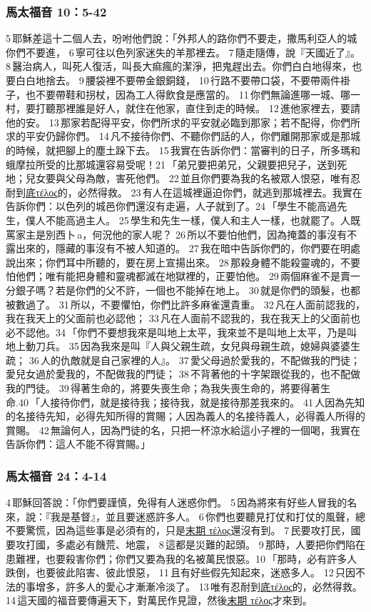 \subsubsection{馬太福音 10：5-42}
5 耶穌差這十二個人去，吩咐他們說：「外邦人的路你們不要走，撒馬利亞人的城你們不要進， 6 寧可往以色列家迷失的羊那裡去。 7 隨走隨傳，說『天國近了』。 8 醫治病人，叫死人復活，叫長大痲瘋的潔淨，把鬼趕出去。你們白白地得來，也要白白地捨去。 9 腰袋裡不要帶金銀銅錢， 10 行路不要帶口袋，不要帶兩件褂子，也不要帶鞋和拐杖，因為工人得飲食是應當的。 11 你們無論進哪一城、哪一村，要打聽那裡誰是好人，就住在他家，直住到走的時候。 12 進他家裡去，要請他的安。 13 那家若配得平安，你們所求的平安就必臨到那家；若不配得，你們所求的平安仍歸你們。 14 凡不接待你們、不聽你們話的人，你們離開那家或是那城的時候，就把腳上的塵土跺下去。 15 我實在告訴你們：當審判的日子，所多瑪和蛾摩拉所受的比那城還容易受呢！21 「弟兄要把弟兄，父親要把兒子，送到死地；兒女要與父母為敵，害死他們。 22 並且你們要為我的名被眾人恨惡，唯有忍耐到\underline{底τέλος}的，必然得救。 23 有人在這城裡逼迫你們，就逃到那城裡去。我實在告訴你們：以色列的城邑你們還沒有走遍，人子就到了。24 「學生不能高過先生，僕人不能高過主人。 25 學生和先生一樣，僕人和主人一樣，也就罷了。人既罵家主是別西卜 a，何況他的家人呢？ 26 所以不要怕他們，因為掩蓋的事沒有不露出來的，隱藏的事沒有不被人知道的。 27 我在暗中告訴你們的，你們要在明處說出來；你們耳中所聽的，要在房上宣揚出來。 28 那殺身體不能殺靈魂的，不要怕他們；唯有能把身體和靈魂都滅在地獄裡的，正要怕他。 29 兩個麻雀不是賣一分銀子嗎？若是你們的父不許，一個也不能掉在地上。 30 就是你們的頭髮，也都被數過了。 31 所以，不要懼怕，你們比許多麻雀還貴重。 32 凡在人面前認我的，我在我天上的父面前也必認他； 33 凡在人面前不認我的，我在我天上的父面前也必不認他。34 「你們不要想我來是叫地上太平，我來並不是叫地上太平，乃是叫地上動刀兵。 35 因為我來是叫『人與父親生疏，女兒與母親生疏，媳婦與婆婆生疏； 36 人的仇敵就是自己家裡的人』。 37 愛父母過於愛我的，不配做我的門徒；愛兒女過於愛我的，不配做我的門徒； 38 不背著他的十字架跟從我的，也不配做我的門徒。 39 得著生命的，將要失喪生命；為我失喪生命的，將要得著生命.40 「人接待你們，就是接待我；接待我，就是接待那差我來的。 41 人因為先知的名接待先知，必得先知所得的賞賜；人因為義人的名接待義人，必得義人所得的賞賜。 42 無論何人，因為門徒的名，只把一杯涼水給這小子裡的一個喝，我實在告訴你們：這人不能不得賞賜。」



\subsubsection{馬太福音 24：4-14}
 4 耶穌回答說：「你們要謹慎，免得有人迷惑你們。 5 因為將來有好些人冒我的名來，說：『我是基督』，並且要迷惑許多人。 6 你們也要聽見打仗和打仗的風聲，總不要驚慌，因為這些事是必須有的，只是\underline{末期 τέλος}還沒有到。 7 民要攻打民，國要攻打國，多處必有饑荒、地震， 8 這都是災難的起頭。 9 那時，人要把你們陷在患難裡，也要殺害你們；你們又要為我的名被萬民恨惡。10 「那時，必有許多人跌倒，也要彼此陷害、彼此恨惡， 11 且有好些假先知起來，迷惑多人。 12 只因不法的事增多，許多人的愛心才漸漸冷淡了。 13 唯有忍耐到\underline{底τέλος}的，必然得救。 14 這天國的福音要傳遍天下，對萬民作見證，然後\underline{末期 τέλος}才來到。

